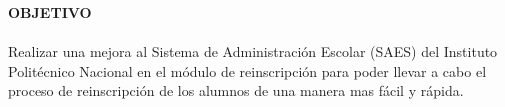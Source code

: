\begin{center}
\thispagestyle{empty}
\vspace{2cm}
\LARGE{\textbf{OBJETIVO}}\\[1.0cm]
\end{center}
\thispagestyle{empty}
\large{\paragraph{}Realizar una mejora al Sistema de Administración Escolar (SAES) del Instituto Politécnico Nacional en el módulo de reinscripción para poder llevar a cabo el proceso de reinscripción de los alumnos de una manera mas fácil y rápida.}